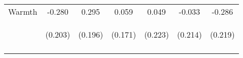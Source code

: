 \begin{tabular}{lcccccc}
\noalign{\smallskip}Warmth & -0.280 & 0.295 & 0.059 & 0.049 & -0.033 & -0.286\\
 & \begin{footnotesize}(0.203)\end{footnotesize} & \begin{footnotesize}(0.196)\end{footnotesize} & \begin{footnotesize}(0.171)\end{footnotesize} & \begin{footnotesize}(0.223)\end{footnotesize} & \begin{footnotesize}(0.214)\end{footnotesize} & \begin{footnotesize}(0.219)\end{footnotesize}\\
\noalign{\smallskip}\hline\end{tabular}\\
